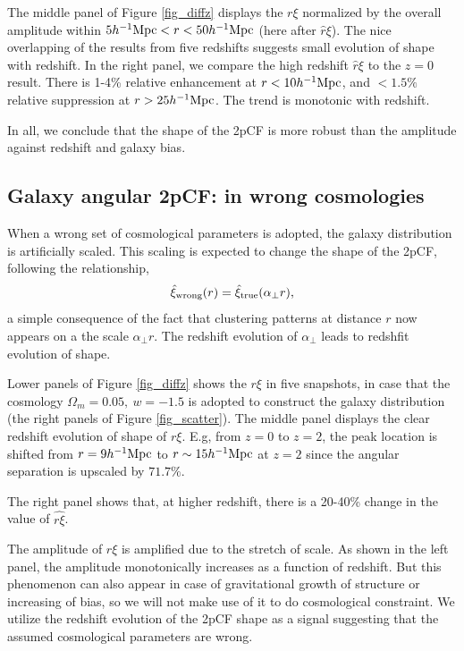 \documentclass[iop]{emulateapj}
\begin{document}
The middle panel of Figure \ref{fig_diffz} displays the $r\xi$ normalized by the overall amplitude within $5h^{-1}{\rm Mpc} < r < 50h^{-1}{\rm Mpc}$
(here after $\hat r\xi$).
The nice overlapping of the results from five redshifts 
suggests small evolution of shape with redshift.
In the right panel, we compare the high redshift $\hat r\xi$ 
to the $z=0$ result.
There is 1-4\% relative enhancement 
at $r<10h^{-1}\rm Mpc$,
and $<1.5\%$ relative suppression at $r>25 h^{-1}\rm Mpc$.
The trend is monotonic with redshift.

In all, we conclude that the shape of the 2pCF is more robust than the amplitude against redshift and galaxy bias.

\subsection{Galaxy angular 2pCF: in wrong cosmologies }

When a wrong set of cosmological parameters is adopted,
the galaxy distribution is artificially scaled.
This scaling is expected to change the shape of the 2pCF,
following the relationship,
\begin{equation}
 \hat \xi_{\rm wrong}(r) = \hat\xi_{\rm true}(\alpha_{\bot} r),
\end{equation}
a simple consequence of the fact that clustering patterns at distance $r$ now appears on a the scale $\alpha_{\bot} r$.
The redshift evolution of $\alpha_{\bot}$ leads to redshfit evolution of shape.


Lower panels of Figure \ref{fig_diffz} shows the $r\xi$ in five 
snapshots, in case that the cosmology $\Omega_m=0.05,\ w=-1.5$ 
is adopted to construct the galaxy distribution (the right panels of Figure \ref{fig_scatter}).
The middle panel displays the clear redshift evolution of shape of $r\xi$.
E.g, from $z=0$ to $z=2$,
the peak location is shifted from $r=9h^{-1} \rm Mpc$ to $r\sim15 h^{-1}\rm Mpc$ at $z=2$
since the angular separation is upscaled by $71.7\%$.

The right panel shows that, 
at higher redshift, 
there is a 20-40\% change in the value of $\hat {r\xi}$.

The amplitude of $r\xi$ is amplified due to the stretch of scale.
As shown in the left panel, the amplitude monotonically increases as a function of redshift.
But this phenomenon can also appear in case of gravitational growth of structure or increasing of bias,
so we will not make use of it to do cosmological constraint.
We utilize the redshift evolution of the 2pCF shape as a signal suggesting that the assumed cosmological parameters are wrong.
\end{document}
